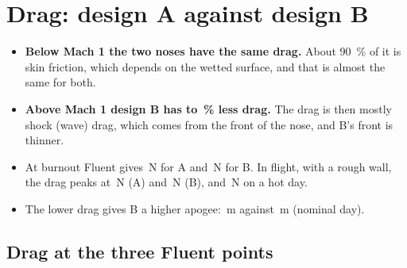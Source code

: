 \clearpage
\section{Drag: design A against design B}
\label{sec:drag}

\begin{keybox}
\begin{itemize}
\item \textbf{Below Mach 1 the two noses have the same drag.} About \SI{90}{\percent} of it is skin
friction, which depends on the wetted surface, and that is almost the same for both.
\item \textbf{Above Mach 1 design B has  to \,\% less drag.} The drag
is then mostly shock (wave) drag, which comes from the front of the nose, and B's front is thinner.
\item At burnout Fluent gives \,N for A and \,N for B. In flight, with a
rough wall, the drag peaks at \,N (A) and \,N (B),
 and \,N on a hot day.
\item The lower drag gives B a higher apogee: \,m against \,m (nominal day).
\end{itemize}
\end{keybox}

\subsection{Drag at the three Fluent points}

